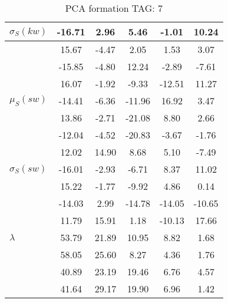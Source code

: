 \begin{table}[h!]
\begin{center}
\begin{tabular}{| l | c | c | c | c | c |}
$\sigma_S(kw)$ & -16.71  & 2.96  & 5.46  & -1.01  & 10.24 \\\hline
 & 15.67  & -4.47  & 2.05  & 1.53  & 3.07 \\\hline
 & -15.85  & -4.80  & 12.24  & -2.89  & -7.61 \\\hline
 & 16.07  & -1.92  & -9.33  & -12.51  & 11.27 \\\hline
$\mu_S(sw)$ & -14.41  & -6.36  & -11.96  & 16.92  & 3.47 \\\hline
 & 13.86  & -2.71  & -21.08  & 8.80  & 2.66 \\\hline
 & -12.04  & -4.52  & -20.83  & -3.67  & -1.76 \\\hline
 & 12.02  & 14.90  & 8.68  & 5.10  & -7.49 \\\hline
$\sigma_S(sw)$ & -16.01  & -2.93  & -6.71  & 8.37  & 11.02 \\\hline
 & 15.22  & -1.77  & -9.92  & 4.86  & 0.14 \\\hline
 & -14.03  & 2.99  & -14.78  & -14.05  & -10.65 \\\hline
 & 11.79  & 15.91  & 1.18  & -10.13  & 17.66 \\\hline
$\lambda$ & 53.79  & 21.89  & 10.95  & 8.82  & 1.68 \\\hline
 & 58.05  & 25.60  & 8.27  & 4.36  & 1.76 \\\hline
 & 40.89  & 23.19  & 19.46  & 6.76  & 4.57 \\\hline
 & 41.64  & 29.17  & 19.90  & 6.96  & 1.42 \\\hline
\end{tabular}
\caption{PCA formation TAG: 7}
\end{center}
\end{table}